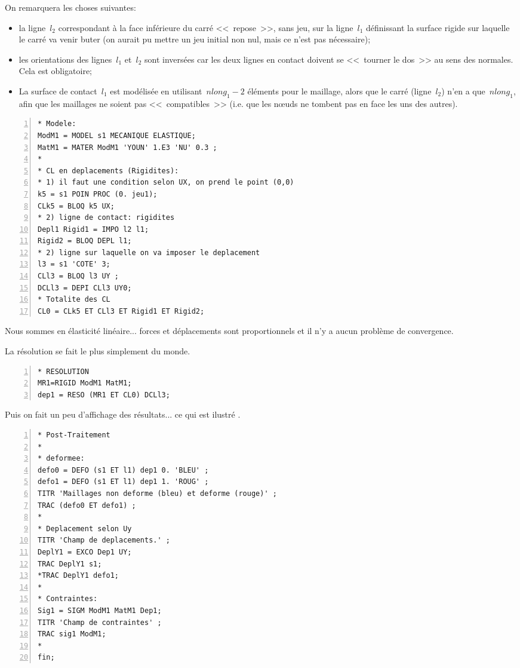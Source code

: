 \medskip
On remarquera les choses suivantes:
\begin{itemize}
  \item la ligne~$l_2$ correspondant à la face inférieure du carré <<~repose~>>, sans jeu, sur la
	ligne~$l_1$ définissant la surface rigide sur laquelle le carré va venir buter (on aurait pu mettre
	un jeu initial non nul, mais ce n'est pas nécessaire);
  \item les orientations des lignes~$l_1$ et~$l_2$ sont inversées car les deux lignes en contact doivent se 
	<<~tourner le dos~>> au sens des normales. Cela est obligatoire;
  \item La surface de contact~$l_1$ est modélisée en utilisant~$nlong_1-2$ éléments pour le maillage, 
	alors que le carré (ligne~$l_2$) n'en a que~$nlong_1$, afin que les maillages ne soient pas <<~compatibles~>> 
	(i.e. que les nœuds ne tombent pas en face les uns des autres).
\end{itemize}

\color{gris}\scriptsize
\begin{multicols}{2}
\begin{Verbatim}[numbers=left,numbersep=3pt,firstnumber=last]
* Modele:
ModM1 = MODEL s1 MECANIQUE ELASTIQUE;
MatM1 = MATER ModM1 'YOUN' 1.E3 'NU' 0.3 ;
*
* CL en deplacements (Rigidites):
* 1) il faut une condition selon UX, on prend le point (0,0)
k5 = s1 POIN PROC (0. jeu1);
CLk5 = BLOQ k5 UX;
* 2) ligne de contact: rigidites
Depl1 Rigid1 = IMPO l2 l1;
Rigid2 = BLOQ DEPL l1;
* 2) ligne sur laquelle on va imposer le deplacement
l3 = s1 'COTE' 3;
CLl3 = BLOQ l3 UY ;
DCLl3 = DEPI CLl3 UY0;
* Totalite des CL
CL0 = CLk5 ET CLl3 ET Rigid1 ET Rigid2;
\end{Verbatim}
\end{multicols}
\color{black}\normalsize

\medskip
Nous sommes en élasticité linéaire... forces et déplacements sont proportionnels et il n'y a aucun problème 
de convergence.

La résolution se fait le plus simplement du monde.

\color{gris}\scriptsize
\begin{Verbatim}[numbers=left,numbersep=3pt,firstnumber=last]
* RESOLUTION
MR1=RIGID ModM1 MatM1;
dep1 = RESO (MR1 ET CL0) DCLl3;
\end{Verbatim}
\color{black}\normalsize

\medskip
Puis on fait un peu d'affichage des résultats... ce qui est ilustré .

\color{gris}\scriptsize
\begin{multicols}{2}
\begin{Verbatim}[numbers=left,numbersep=3pt,firstnumber=last]
* Post-Traitement
*
* deformee:
defo0 = DEFO (s1 ET l1) dep1 0. 'BLEU' ;
defo1 = DEFO (s1 ET l1) dep1 1. 'ROUG' ;
TITR 'Maillages non deforme (bleu) et deforme (rouge)' ;
TRAC (defo0 ET defo1) ;
*
* Deplacement selon Uy
TITR 'Champ de deplacements.' ;
DeplY1 = EXCO Dep1 UY;
TRAC DeplY1 s1;
*TRAC DeplY1 defo1;
*
* Contraintes:
Sig1 = SIGM ModM1 MatM1 Dep1;
TITR 'Champ de contraintes' ;
TRAC sig1 ModM1;
*
fin;
\end{Verbatim}
\end{multicols}
\color{black}\normalsize

